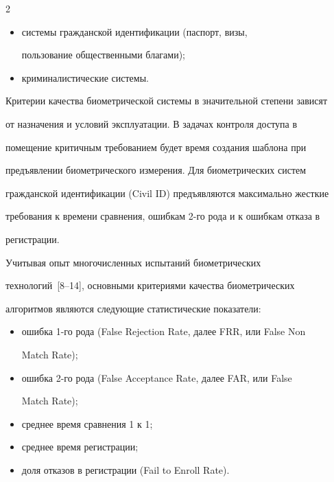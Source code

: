 \begin{multicols}{2}
\begin{enumerate}[1.]
\begin{itemize}
\item системы гражданской идентификации (паспорт, визы, 

пользование общественными благами);

\item криминалистические системы.

  \end{itemize}

  \end{enumerate}

  

  Критерии качества биометрической системы в значительной степени зависят 

от назначения и условий эксплуатации. В задачах контроля доступа в 

помещение критичным требованием будет время создания шаблона при 

предъявлении биометрического измерения. Для биометрических систем 

гражданской идентификации (Civil ID) предъявляются максимально жесткие 

требования к времени сравнения, ошибкам 2-го рода и к ошибкам отказа в 

регистрации.

  

  Учитывая опыт многочисленных испытаний биометрических 

  технологий~[8--14], основными критериями качества биометрических 

алгоритмов являются следующие статистические показатели:

  \begin{itemize}

\item ошибка 1-го рода (False Rejection Rate, далее FRR, или False Non 

Match Rate);

\item ошибка 2-го рода (False Acceptance Rate, далее FAR, или False 

Match Rate);

\item среднее время сравнения 1 к 1;

\item среднее время регистрации;

\item доля отказов в регистрации (Fail to Enroll Rate).

\end{itemize}


\end{multicols}
